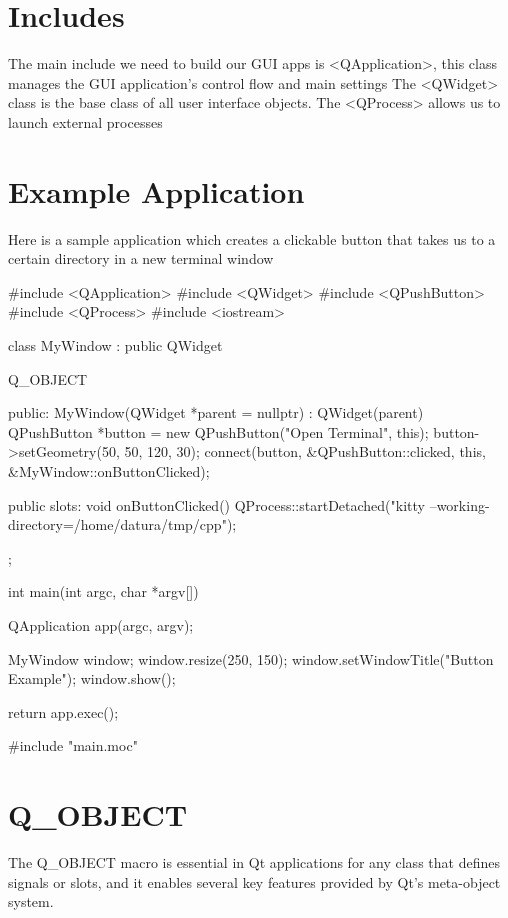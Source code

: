 \documentclass{report}
\begin{document}
    \pagebreak 
    \section*{Includes}
    \bigbreak \noindent 
    The main include we need to build our GUI apps is <QApplication>, this class manages the GUI application's control flow and main settings
    \bigbreak \noindent 
    The <QWidget> class is the base class of all user interface objects. 
    \bigbreak \noindent 
    The <QProcess> allows us to launch external processes

    \bigbreak \noindent 
    \section*{Example Application}
    \bigbreak \noindent 
    Here is a sample application which creates a clickable button that takes us to a certain directory in a new terminal window
    \bigbreak \noindent 
    \begin{cppcode}
#include <QApplication>
#include <QWidget>
#include <QPushButton>
#include <QProcess>
#include <iostream>

class MyWindow : public QWidget {
    Q_OBJECT

public:
    MyWindow(QWidget *parent = nullptr) : QWidget(parent) {
        QPushButton *button = new QPushButton("Open Terminal", this);
        button->setGeometry(50, 50, 120, 30);
        connect(button, &QPushButton::clicked, this, &MyWindow::onButtonClicked);
    }

public slots:
    void onButtonClicked() {
        QProcess::startDetached("kitty --working-directory=/home/datura/tmp/cpp");
    }
};

int main(int argc, char *argv[]) {
    QApplication app(argc, argv);

    MyWindow window;
    window.resize(250, 150);
    window.setWindowTitle("Button Example");
    window.show();

    return app.exec();
}

#include "main.moc"
    \end{cppcode}

    \pagebreak 
    \section*{Q\_OBJECT}
    \bigbreak \noindent 
    The Q\_OBJECT macro is essential in Qt applications for any class that defines signals or slots, and it enables several key features provided by Qt's meta-object system.
\end{document}
